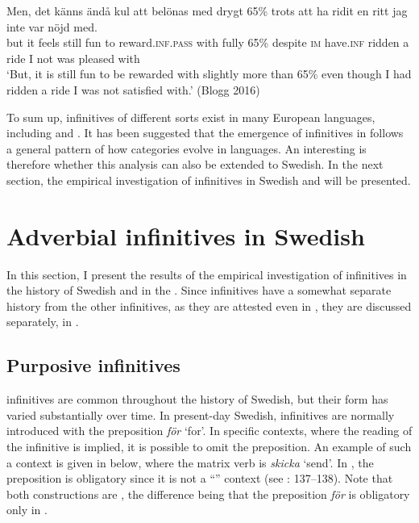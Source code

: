 \documentclass[output=paper]{langscibook}
\begin{document}
\ex  \label{ex:kalm:7b}
\gll Men, det känns ändå kul att belönas med drygt 65\% trots att ha ridit en ritt jag inte var nöjd med.\\
but it feels still fun to reward.\textsc{inf.pass} with fully 65\% despite \textsc{im} have.\textsc{inf} ridden a ride I not was pleased with\\ 
\glt ‘But, it is still fun to be rewarded with slightly more than 65\% even though I had ridden a ride I was not satisfied with.’ (Blogg 2016)
\z 
\z 



To sum up,  infinitives of different sorts exist in many European languages, including  and . It has been suggested that the emergence of  infinitives in  follows a general pattern of how  categories evolve in languages. An interesting  is therefore whether this analysis can also be extended to Swedish. In the next section, the empirical investigation of  infinitives in Swedish and  will be presented. 


\section{Adverbial infinitives in Swedish}\label{sec:kalm:4}
In this section, I present the results of the empirical investigation of  infinitives in the history of Swedish and in the  . Since  infinitives have a somewhat separate history from the other  infinitives, as they are attested even in , they are discussed separately, in .


\subsection{Purposive infinitives}\label{sec:kalm:4.1}
 infinitives are common throughout the history of Swedish, but their form has varied substantially over time. In present-day Swedish,  infinitives are normally introduced with the preposition \textit{för} ‘for’. In specific contexts, where the  reading of the infinitive is implied, it is possible to omit the preposition. An example of such a context is given in  below, where the matrix verb is \textit{skicka} ‘send’. In , the preposition is obligatory since it is not a “” context (see \citealt{Kalm2016Satsekvivalenta}: 137–138). Note that both constructions are , the difference being that the preposition \textit{för} is obligatory only in .
\end{document}
